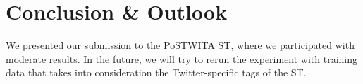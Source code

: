 \documentclass[11pt]{article}
\begin{document}
\section{Conclusion \& Outlook} %
\label{sec:conclusion}

We presented our submission to the PoSTWITA ST, where we participated
with moderate results. 
In the future, we will try to rerun the experiment with training data that
takes into consideration the Twitter-specific tags of the ST.






\end{document}
